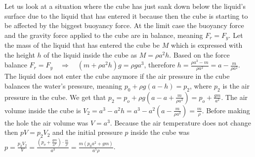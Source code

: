 \solueng
Let us look at a situation where the cube has just sank down below the liquid’s surface due to the liquid that has entered it because then the cube is starting to be affected by the biggest buoyancy force. At the limit case the buoyancy force and the gravity force applied to the cube are in balance, meaning $F_r = F_y$. Let the mass of the liquid that has entered the cube be $M$ which is expressed with the height $h$ of the liquid inside the cube as $M = \rho a^2h$. Based on the force balance $F_r = F_y \quad\Rightarrow\quad (m + \rho a^2h)g=\rho ga^3$, therefore $h = \frac{\rho a^3 - m}{\rho a^2} = a - \frac{m}{\rho a^2}$. The liquid does not enter the cube anymore if the air pressure in the cube balances the water’s pressure, meaning $p_0 + \rho g(a-h) = p_2$, where $p_2$ is the air pressure in the cube. We get that $p_2 = p_o + \rho g\left(a - a + \frac{m}{\rho a^2}\right) = p_o +  \frac{gm}{a^2}$. The air volume inside the cube is $V_2 = a^3 - a^2h = a^3 - a^2\left(a - \frac{m}{\rho a^2}\right) = \frac{m}{\rho}$. Before making the hole the air volume was $V=a^3$. Because the air temperature does not change then $pV = p_2V_2$ and the initial pressure $p$ inside the cube was $p = \frac{p_2V_2}{V} = \frac{ \left( p_o +  \frac{gm}{a^2} \right) \cdot \frac{m}{\rho}}{a^3} = \frac{m(p_0a^2 + gm)}{a^5\rho}$.
\probend